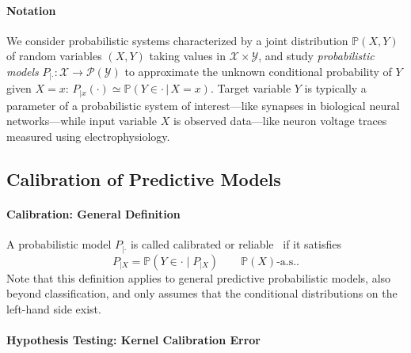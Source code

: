 \documentclass{uai2023} %
\begin{document}
\paragraph{Notation}
We consider probabilistic systems characterized by a joint distribution $\mathbb{P}(X, Y)$ of random variables $(X, Y)$ taking values in $\mathcal{X} \times \mathcal{Y}$,
and study \emph{probabilistic models} $P_{|\cdot} \colon \mathcal{X} \to \mathcal{P}(\mathcal{Y})$ to approximate the unknown conditional probability of $Y$ given $X = x$: $P_{|x}(\cdot) \simeq \mathbb{P}(Y \in \cdot \,|\, X = x)$.
Target variable $Y$ is typically a parameter of a probabilistic system of interest---like synapses in biological neural networks---while input variable $X$ is observed data---like neuron voltage traces measured using electrophysiology.

\subsection{Calibration of Predictive Models}\label{subsec:calibration}

\paragraph{Calibration: General Definition}

A probabilistic model $P_{|\cdot}$ is called calibrated or reliable~\citep{brocker2008some,zadrozny2001obtaining,widmann2022calibration} if it satisfies
\begin{equation}\label{eq:calibration}
P_{|X} = \mathbb{P}\left(Y \in \cdot \mid P_{|X} \right) \qquad \mathbb{P}(X)\text{-a.s.}.
\end{equation}
Note that this definition applies to general predictive probabilistic models, also beyond classification, and only assumes that the conditional distributions on the left-hand side exist.

\paragraph{Hypothesis Testing: Kernel Calibration Error} 
\end{document}
